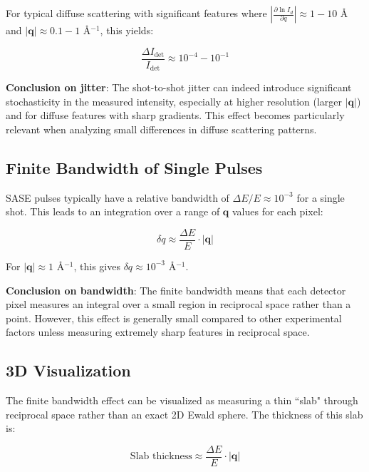 \documentclass[12pt,a4paper]{article}
\begin{document}
For typical diffuse scattering with significant features where $\left|\frac{\partial \ln I_d}{\partial q}\right| \approx 1-10$ \AA{} and $|\mathbf{q}| \approx 0.1-1$ \AA{}$^{-1}$, this yields:

\begin{equation}
\frac{\Delta I_{\text{det}}}{I_{\text{det}}} \approx 10^{-4}-10^{-1}
\end{equation}

\textbf{Conclusion on jitter}: The shot-to-shot jitter can indeed introduce significant stochasticity in the measured intensity, especially at higher resolution (larger $|\mathbf{q}|$) and for diffuse features with sharp gradients. This effect becomes particularly relevant when analyzing small differences in diffuse scattering patterns.

\subsection{Finite Bandwidth of Single Pulses}

SASE pulses typically have a relative bandwidth of $\Delta E/E \approx 10^{-3}$ for a single shot. This leads to an integration over a range of $\mathbf{q}$ values for each pixel:

\begin{equation}
\delta q \approx \frac{\Delta E}{E} \cdot |\mathbf{q}|
\end{equation}

For $|\mathbf{q}| \approx 1$ \AA{}$^{-1}$, this gives $\delta q \approx 10^{-3}$ \AA{}$^{-1}$.

\textbf{Conclusion on bandwidth}: The finite bandwidth means that each detector pixel measures an integral over a small region in reciprocal space rather than a point. However, this effect is generally small compared to other experimental factors unless measuring extremely sharp features in reciprocal space.

\subsection{3D Visualization}

The finite bandwidth effect can be visualized as measuring a thin ``slab" through reciprocal space rather than an exact 2D Ewald sphere. The thickness of this slab is:

\begin{equation}
\text{Slab thickness} \approx \frac{\Delta E}{E} \cdot |\mathbf{q}|
\end{equation}
\end{document}
